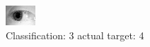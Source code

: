 \begin{figure}[h!]
\begin{center}
\includegraphics[width=0.60\columnwidth]{figures/ID1237_class_3_target_4.png}
\end{center}
\caption{ Classification: 3 actual target: 4}
\label{fig:ID1237_class_3_target_4}
\end{figure}
